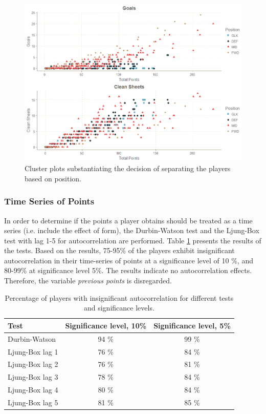 \begin{figure}[H]
    \centering
    \includegraphics[scale=0.55]{fig/chapter_6/goals_cs.png}
    \caption{Cluster plots substantiating the decision of separating the players based on position.}
\label{fig:cluster_plots}    
\end{figure}%



\subsubsection{Time Series of Points}

In order to determine if the points a player obtains should be treated as a time series (i.e. include the effect of form), the Durbin-Watson test and the Ljung-Box test with lag 1-5 for autocorrelation are performed. Table \ref{tab:auto_tests} presents the results of the tests. Based on the results, 75-95\% of the players exhibit insignificant autocorrelation in their time-series of points at a significance level of 10 \%, and 80-99\% at significance level 5\%. The results indicate no autocorrelation effects. Therefore, the variable \textit{previous points} is disregarded.

\begin{table}[H]
\centering
\begin{tabular}{|l|c|c|}
\hline
Test            & Significance level, 10\% & Significance level, 5\% \\
\hline
Durbin-Watson   & 94 \% & 99 \%                                            \\
Ljung-Box lag 1 & 76 \% & 84 \%                                            \\
Ljung-Box lag 2 & 76 \% & 81 \%                                            \\
Ljung-Box lag 3 & 78 \% & 84 \%                                            \\
Ljung-Box lag 4 & 80 \% & 84 \%                                           \\
Ljung-Box lag 5 & 81 \% & 85 \%                
\\
\hline
\end{tabular}
\caption{Percentage of players with insignificant autocorrelation for different tests and significance levels.}
\label{tab:auto_tests}
\end{table}


